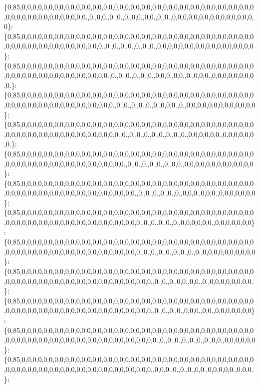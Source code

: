 \{0,85,0,0,0,0,0,0,0,0,0,0,0,0,0,0,0,0,0,0,0,0,0,0,0,0,0,0,0,0,0,0,0,0,0,0,0,0,0,0,0,0,0,0,0,0,0,0,0,0,0,0,0,0,0,0,0,0,0,0.,0.,0,0.,0.,0.,0.,0,0.,0,0.,0.,0.,0,0,0,0,0,0,0,0,0,0,0,0,0,0,0,0\}\+: \{0,85,0,0,0,0,0,0,0,0,0,0,0,0,0,0,0,0,0,0,0,0,0,0,0,0,0,0,0,0,0,0,0,0,0,0,0,0,0,0,0,0,0,0,0,0,0,0,0,0,0,0,0,0,0,0,0,0,0,0,0,0,0.,0.,0.,0.,0.,0.,0.,0.,0,0,0,0,0,0,0,0,0,0,0,0,0,0,0,0,0,0\}\+: \{0,85,0,0,0,0,0,0,0,0,0,0,0,0,0,0,0,0,0,0,0,0,0,0,0,0,0,0,0,0,0,0,0,0,0,0,0,0,0,0,0,0,0,0,0,0,0,0,0,0,0,0,0,0,0,0,0,0,0,0,0,0,0,0.,0.,0.,0.,0.,0.,0.,0,0,0.,0,0.,0.,0,0,0.,0,0,0,0,0,0,0,0,0.\}\+: \{0,85,0,0,0,0,0,0,0,0,0,0,0,0,0,0,0,0,0,0,0,0,0,0,0,0,0,0,0,0,0,0,0,0,0,0,0,0,0,0,0,0,0,0,0,0,0,0,0,0,0,0,0,0,0,0,0,0,0,0,0,0,0,0,0.,0.,0.,0.,0.,0.,0.,0,0,0.,0.,0,0,0,0,0,0,0,0,0,0,0,0,0\}\+: \{0,85,0,0,0,0,0,0,0,0,0,0,0,0,0,0,0,0,0,0,0,0,0,0,0,0,0,0,0,0,0,0,0,0,0,0,0,0,0,0,0,0,0,0,0,0,0,0,0,0,0,0,0,0,0,0,0,0,0,0,0,0,0,0,0,0.,0.,0.,0.,0.,0.,0.,0.,0.,0.,0,0,0,0,0,0.,0,0,0,0,0,0,0.\}\+: \{0,85,0,0,0,0,0,0,0,0,0,0,0,0,0,0,0,0,0,0,0,0,0,0,0,0,0,0,0,0,0,0,0,0,0,0,0,0,0,0,0,0,0,0,0,0,0,0,0,0,0,0,0,0,0,0,0,0,0,0,0,0,0,0,0,0,0.,0.,0.,0.,0.,0.,0.,0,0.,0,0,0,0,0,0,0,0,0,0,0,0,0\}\+: \{0,85,0,0,0,0,0,0,0,0,0,0,0,0,0,0,0,0,0,0,0,0,0,0,0,0,0,0,0,0,0,0,0,0,0,0,0,0,0,0,0,0,0,0,0,0,0,0,0,0,0,0,0,0,0,0,0,0,0,0,0,0,0,0,0,0,0,0,0.,0.,0.,0.,0.,0.,0.,0,0,0.,0,0,0.,0,0,0,0,0,0,0\}\+: \{0,85,0,0,0,0,0,0,0,0,0,0,0,0,0,0,0,0,0,0,0,0,0,0,0,0,0,0,0,0,0,0,0,0,0,0,0,0,0,0,0,0,0,0,0,0,0,0,0,0,0,0,0,0,0,0,0,0,0,0,0,0,0,0,0,0,0,0,0,0.,0.,0.,0.,0.,0.,0,0,0,0,0,0.,0,0,0,0,0,0,0\}\+: \{0,85,0,0,0,0,0,0,0,0,0,0,0,0,0,0,0,0,0,0,0,0,0,0,0,0,0,0,0,0,0,0,0,0,0,0,0,0,0,0,0,0,0,0,0,0,0,0,0,0,0,0,0,0,0,0,0,0,0,0,0,0,0,0,0,0,0,0,0,0.,0.,0.,0.,0.,0.,0.,0.,0.,0,0,0,0,0,0,0,0,0,0\}\+: \{0,85,0,0,0,0,0,0,0,0,0,0,0,0,0,0,0,0,0,0,0,0,0,0,0,0,0,0,0,0,0,0,0,0,0,0,0,0,0,0,0,0,0,0,0,0,0,0,0,0,0,0,0,0,0,0,0,0,0,0,0,0,0,0,0,0,0,0,0,0,0,0.,0.,0.,0.,0,0.,0,0.,0.,0,0,0,0,0,0,0,0.\}\+: \{0,85,0,0,0,0,0,0,0,0,0,0,0,0,0,0,0,0,0,0,0,0,0,0,0,0,0,0,0,0,0,0,0,0,0,0,0,0,0,0,0,0,0,0,0,0,0,0,0,0,0,0,0,0,0,0,0,0,0,0,0,0,0,0,0,0,0,0,0,0,0,0.,0.,0.,0.,0.,0,0,0.,0,0.,0,0,0,0,0,0,0\}\+: \{0,85,0,0,0,0,0,0,0,0,0,0,0,0,0,0,0,0,0,0,0,0,0,0,0,0,0,0,0,0,0,0,0,0,0,0,0,0,0,0,0,0,0,0,0,0,0,0,0,0,0,0,0,0,0,0,0,0,0,0,0,0,0,0,0,0,0,0,0,0,0,0,0.,0.,0.,0.,0.,0.,0.,0.,0,0.,0,0,0,0,0,0\}\+: \{0,85,0,0,0,0,0,0,0,0,0,0,0,0,0,0,0,0,0,0,0,0,0,0,0,0,0,0,0,0,0,0,0,0,0,0,0,0,0,0,0,0,0,0,0,0,0,0,0,0,0,0,0,0,0,0,0,0,0,0,0,0,0,0,0,0,0,0,0,0,0,0.,0,0,0.,0.,0.,0.,0,0.,0,0,0,0,0.,0,0,0.\}\+: 